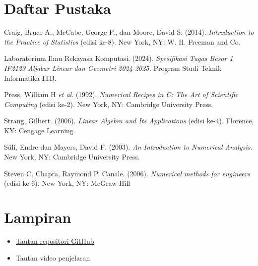 \section{Daftar Pustaka}

Craig, Bruce A., McCabe, George P., dan Moore, David S. (2014). \textit{Introduction to the Practice of Statistics} (edisi ke-8). New York, NY: W. H. Freeman and Co.\par
Laboratorium Ilmu Rekayasa Komputasi. (2024). \textit{Spesifikasi Tugas Besar 1 IF2123 Aljabar Linear dan Geometri 2024-2025.} Program Studi Teknik Informatika ITB. \par
Press, William H \textit{et al}. (1992). \textit{Numerical Recipes in C: The Art of Scientific Computing} (edisi ke-2). New York, NY: Cambridge University Press. \par
Strang, Gilbert. (2006). \textit{Linear Algebra and Its Applications} (edisi ke-4). Florence, KY: Cengage Learning.\par
S{\"u}li, Endre dan Mayers, David F. (2003). \textit{An Introduction to Numerical Analysis}. New York, NY: Cambridge University Press. \par
Steven C. Chapra, Raymond P. Canale. (2006). \textit{Numerical methods for engineers} (edisi ke-6). New York, NY: McGraw-Hill
\section{Lampiran}
\begin{itemize}
    \item \hyperlink{https://github.com/NayakaZNA/Algeo01-23044/}{Tautan repositori GitHub}
    \item Tautan video penjelasan
\end{itemize}